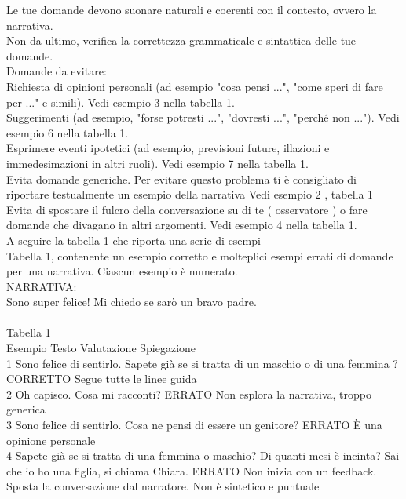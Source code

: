 \begin{itemize}
{       Le tue domande devono suonare naturali e coerenti con il contesto, ovvero la narrativa.\\
       Non da ultimo, verifica la correttezza grammaticale e sintattica delle tue domande.\\
       Domande da evitare:\\
       Richiesta di opinioni personali (ad esempio "cosa pensi ...", "come speri di fare per ..." e simili). Vedi esempio 3 nella tabella 1.\\
       Suggerimenti (ad esempio, "forse potresti ...", "dovresti ...", "perché non ..."). Vedi esempio 6 nella tabella 1.\\
       Esprimere eventi ipotetici (ad esempio, previsioni future, illazioni e immedesimazioni in altri ruoli). Vedi esempio 7 nella tabella 1.\\
       Evita domande generiche. Per evitare questo problema ti è consigliato di riportare testualmente un esempio della narrativa Vedi esempio 2 , tabella 1\\
       Evita di spostare il fulcro della conversazione su di te ( osservatore ) o fare domande che divagano in altri argomenti. Vedi esempio 4 nella tabella 1.\\
       A seguire la tabella 1 che riporta una serie di esempi\\
       Tabella 1, contenente un esempio corretto e molteplici esempi errati di domande per una narrativa. Ciascun esempio è numerato.\\
       NARRATIVA:\\
        Sono super felice! Mi chiedo se sarò un bravo padre. \\
       \\
       Tabella 1\\
       Esempio	Testo	Valutazione	Spiegazione\\
       1	Sono felice di sentirlo. Sapete già se si tratta di un maschio o di una femmina ?	CORRETTO	Segue tutte le linee guida\\
       2	Oh capisco. Cosa mi racconti? 	ERRATO	Non esplora la narrativa, troppo generica\\
       3	Sono felice di sentirlo. Cosa ne pensi di essere un genitore?	ERRATO	È una opinione personale\\
       4	Sapete già se si tratta di una femmina o maschio? Di quanti mesi è incinta? Sai che io ho una figlia, si chiama Chiara.	ERRATO	 Non inizia con un feedback. Sposta la conversazione dal narratore. Non è sintetico e puntuale\\
}
\end{itemize}
